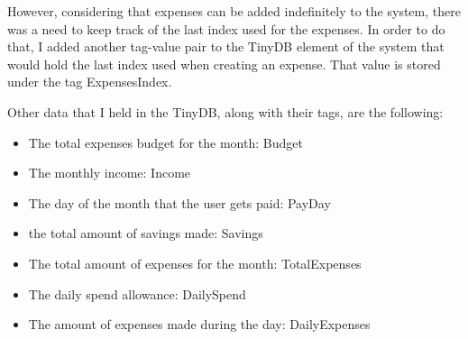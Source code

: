 However, considering that expenses can be added indefinitely to the system, there was a need to keep track of the last index used for the expenses. In order to do that, I added another tag-value pair to the TinyDB element of the system that would hold the last index used when creating an expense. That value is stored under the tag ExpensesIndex.

Other data that I held in the TinyDB, along with their tags, are the following:
\begin{itemize}
  \item The total expenses budget for the month: Budget
  \item The monthly income: Income
  \item The day of the month that the user gets paid: PayDay
  \item the total amount of savings made: Savings
  \item The total amount of expenses for the month: TotalExpenses
  \item The daily spend allowance: DailySpend
  \item The amount of expenses made during the day: DailyExpenses
\end{itemize}
